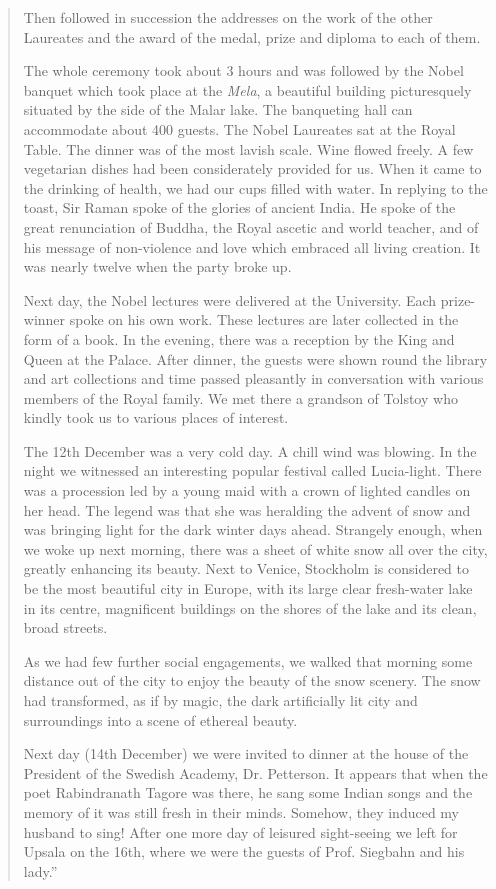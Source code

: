 \begin{quote}
{Then followed in succession the addresses on the work of
the other Laureates and the award of the medal, prize and diploma
to each of them.

The whole ceremony took about 3 hours and was followed
by the Nobel banquet which took place at the {\em Mela}, a beautiful
building picturesquely situated by the side of the Malar lake. The
banqueting hall can accommodate about 400 guests. The Nobel
Laureates sat at the Royal Table. The dinner was of the most
lavish scale. Wine flowed freely. A few vegetarian dishes had been
considerately provided for us. When it came to the drinking of
health, we had our cups filled with water. In replying to the toast,
Sir Raman spoke of the glories of ancient India. He spoke of the
great renunciation of Buddha, the Royal ascetic and world
teacher, and of his message of non-violence and love which
embraced all living creation. It was nearly twelve when the party
broke up.

Next day, the Nobel lectures were delivered at the University.
Each prize-winner spoke on his own work. These lectures are later
collected in the form of a book. In the evening, there was a
reception by the King and Queen at the Palace. After dinner, the
guests were shown round the library and art collections and time
passed pleasantly in conversation with various members of the
Royal family. We met there a grandson of Tolstoy who kindly
took us to various places of interest.

The 12th December was a very cold day. A chill wind was
blowing. In the night we witnessed an interesting popular festival
called Lucia-light. There was a procession led by a young maid
with a crown of lighted candles on her head. The legend was that
she was heralding the advent of snow and was bringing light for
the dark winter days ahead. Strangely enough, when we woke up
next morning, there was a sheet of white snow all over the city,
greatly enhancing its beauty. Next to Venice, Stockholm is
considered to be the most beautiful city in Europe, with its large
clear fresh-water lake in its centre, magnificent buildings on the
shores of the lake and its clean, broad streets.

As we had few further social engagements, we walked that
morning some distance out of the city to enjoy the beauty of the
snow scenery. The snow had transformed, as if by magic, the dark
artificially lit city and surroundings into a scene of ethereal beauty.

Next day (14th December) we were invited to dinner at the
house of the President of the Swedish Academy, Dr. Petterson.
It appears that when the poet Rabindranath Tagore was there,
he sang some Indian songs and the memory of it was still fresh
in their minds. Somehow, they induced my husband to sing!
After one more day of leisured sight-seeing we left for Upsala
on the 16th, where we were the guests of Prof. Siegbahn and
his lady.''
}\relax
\end{quote}

